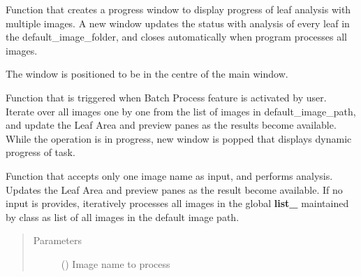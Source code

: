 \documentclass[letterpaper,10pt,english]{sphinxmanual}
\begin{document}
\begin{fulllineitems}
\begin{fulllineitems}
\label{\detokenize{pyleaf.leaf_area_calculator_gui:pyleaf.leaf_area_calculator_gui.LeafAreaCalculatorGUI.new_winF}}
Function that creates a progress window to display progress of leaf analysis with multiple images.
A new window updates the status with analysis of every leaf in the default\_image\_folder, and closes automatically when program processes all images.

The window is positioned to be in the centre of the main window.

\end{fulllineitems}


\begin{fulllineitems}
\label{\detokenize{pyleaf.leaf_area_calculator_gui:pyleaf.leaf_area_calculator_gui.LeafAreaCalculatorGUI.process_all}}
Function that is triggered when Batch Process feature is activated by user.
Iterate over all images one by one from the list of images in default\_image\_path, and update the Leaf Area and preview panes as the results become available.
While the operation is in progress, new window is popped that displays dynamic progress of task.

\end{fulllineitems}


\begin{fulllineitems}
\label{\detokenize{pyleaf.leaf_area_calculator_gui:pyleaf.leaf_area_calculator_gui.LeafAreaCalculatorGUI.process_image}}
Function that accepts only one image name as input, and performs analysis.
Updates the Leaf Area and preview panes as the result become available. If no input is provides, iteratively processes all images in the global {\color{red}\bfseries{}list\_} maintained by class as list of all
images in the default image path.
\begin{quote}\begin{description}
\item[{Parameters}] \leavevmode
{} () \textendash{} Image name to process


\end{description}
\end{quote}
\end{fulllineitems}
\end{fulllineitems}
\end{document}

